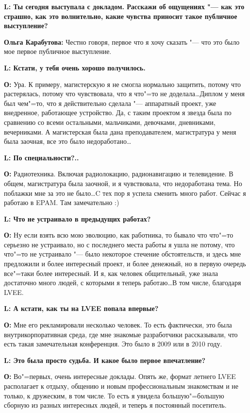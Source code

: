 \documentclass[10pt, a5paper]{article}
\begin{document}
{\noindent \bf L: Ты сегодня выступала с докладом. Расскажи об ощущениях "--- как это страшно, как это волнительно, какие чувства приносит такое публичное выступление?}

{\noindent \bf Ольга Карабутова:} Честно говоря, первое что я хочу сказать "--- что это было мое первое публичное выступление.

{\noindent \bf L: Кстати, у тебя очень хорошо получилось.}

{\noindent \bf О:} Ура. К примеру, магистерскую я не смогла нормально защитить, потому что растерялась, потому что чувствовала, что я что"=то не доделала\ldots Диплом у меня был чем"=то, что я действительно сделала "--- аппаратный проект, уже внедренное, работающее устройство. Да, с таким проектом я звезда была по сравнению со всеми остальными, мальчиками, девочками, дневниками, вечерниками. А магистерская была дана преподавателем, магистратура у меня была заочная, все это было недоработано\ldots

{\noindent \bf L: По специальности?..}

{\noindent \bf О:} Радиотехника. Включая радиолокацию, радионавигацию и телевидение. В общем, магистратура была заочной, и я чувствовала, что недоработана тема. Но поблажки мне за это не было\ldots C тех пор я успела сменить много работ. Сейчас я работаю в EPAM. Там замечательно :)

{\noindent \bf L: Что не устраивало в предыдущих работах?}

{\noindent \bf О:} Ну если взять всю мою эволюцию, как работника, то бывало что что"=то серьезно не устраивало, но с последнего места работы я ушла не потому, что что"=то не устраивало "--- было некоторое стечение обстоятельств, и здесь мне предложили и более интересный проект, и более денежный, но в первую очередь все"=таки более интересный. И я, как человек общительный,  уже знала достаточно много людей, с которыми я теперь работаю\ldots В том числе, благодаря LVEE. 

{\noindent \bf L: А кстати, как ты на LVEE попала впервые?}

{\noindent \bf О:} Мне его рекламировали несколько человек. То есть фактически, это была внутрикорпоративная среда, где мне знакомые разработчики рассказывали, что есть такая замечательная конференция. Это было в 2009 или в 2010 году.

{\noindent \bf L: Это была просто судьба. И какое было первое впечатление?}

{\noindent \bf О:} Во"=первых, очень интересные доклады. Опять же, формат летнего LVEE располагает к отдыху, общению и новым профессиональным знакомствам и не только, к дружеским, в том числе. То есть я увидела большую"=большую сборную из разных интересных людей, и теперь я постоянный посетитель.
\end{document}
